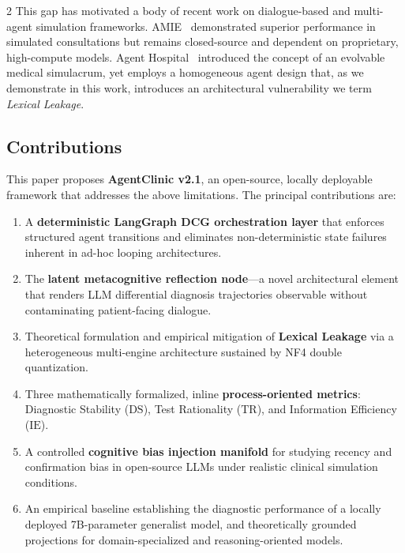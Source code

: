 \documentclass[10pt, a4paper]{article}
\newcommand{\DS}{\mathrm{DS}}
\newcommand{\TR}{\mathrm{TR}}
\newcommand{\IE}{\mathrm{IE}}
\begin{document}
\begin{multicols}{2}
This gap has motivated a body of recent work on dialogue-based and multi-agent simulation frameworks. AMIE~\cite{tu2024towards} demonstrated superior performance in simulated consultations but remains closed-source and dependent on proprietary, high-compute models. Agent Hospital~\cite{li2024agent} introduced the concept of an evolvable medical simulacrum, yet employs a homogeneous agent design that, as we demonstrate in this work, introduces an architectural vulnerability we term \textit{Lexical Leakage}.

\subsection{Contributions}

This paper proposes \textbf{AgentClinic v2.1}, an open-source, locally deployable framework that addresses the above limitations. The principal contributions are:

\begin{enumerate}[leftmargin=*, itemsep=2pt, topsep=2pt]
    \item A \textbf{deterministic LangGraph DCG orchestration layer} that enforces structured agent transitions and eliminates non-deterministic state failures inherent in ad-hoc looping architectures.
    \item The \textbf{latent metacognitive reflection node}—a novel architectural element that renders LLM differential diagnosis trajectories observable without contaminating patient-facing dialogue.
    \item Theoretical formulation and empirical mitigation of \textbf{Lexical Leakage} via a heterogeneous multi-engine architecture sustained by NF4 double quantization.
    \item Three mathematically formalized, inline \textbf{process-oriented metrics}: Diagnostic Stability ($\DS$), Test Rationality ($\TR$), and Information Efficiency ($\IE$).
    \item A controlled \textbf{cognitive bias injection manifold} for studying recency and confirmation bias in open-source LLMs under realistic clinical simulation conditions.
    \item An empirical baseline establishing the diagnostic performance of a locally deployed 7B-parameter generalist model, and theoretically grounded projections for domain-specialized and reasoning-oriented models.
\end{enumerate}



\end{multicols}
\end{document}
